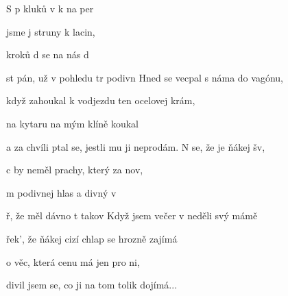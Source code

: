 

\zs
S p kluků v k na per

 jsme j struny k lacin,

 kroků d se na nás d

st pán, už v pohledu tr podivn
\ks
\zs
Hned se vecpal s náma do vagónu,

když zahoukal k vodjezdu ten ocelovej krám,

na kytaru na mým klíně koukal

a za chvíli ptal se, jestli mu ji neprodám.
\ks
\zr
N se, že je ňákej šv,

c by neměl prachy, který  za nov,

m podivnej hlas a divný v

ř, že měl  dávno t takov
\kr
\zs
{}
\ks
\zr  \kr
\zs
Když jsem večer v neděli svý mámě

řek', že ňákej cizí chlap se hrozně zajímá

o věc, která cenu má jen pro ni,

divil jsem se, co ji na tom tolik dojímá...
\ks
\kp







